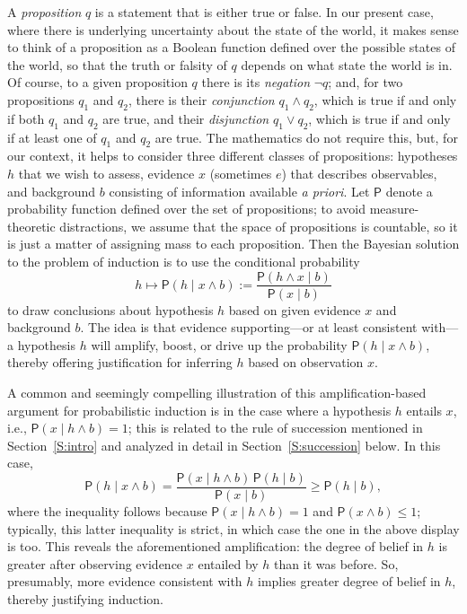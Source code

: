 \documentclass[a4paper, 12pt]{article}
\theoremstyle{plain}
\theoremstyle{definition}
\theoremstyle{remark}
\newcommand{\prob}{\mathsf{P}}
\begin{document}
A {\em proposition} $q$ is a statement that is either true or false.  In our present case, where there is underlying uncertainty about the state of the world, it makes sense to think of a proposition as a Boolean function defined over the possible states of the world, so that the truth or falsity of $q$ depends on what state the world is in.  Of course, to a given proposition $q$ there is its {\em negation} $\neg q$; and, for two propositions $q_1$ and $q_2$, there is their {\em conjunction} $q_1 \land q_2$, which is true if and only if both $q_1$ and $q_2$ are true, and their {\em disjunction} $q_1 \lor q_2$, which is true if and only if at least one of $q_1$ and $q_2$ are true.  The mathematics do not require this, but, for our context, it helps to consider three different classes of propositions: hypotheses $h$ that we wish to assess, evidence $x$ (sometimes $e$) that describes observables, and background $b$ consisting of information available {\em a priori}.  Let $\prob$ denote a probability function defined over the set of propositions; to avoid measure-theoretic distractions, we assume that the space of propositions is countable, so it is just a matter of assigning mass to each proposition.  Then the Bayesian solution to the problem of induction is to use the conditional probability 
\[ h \mapsto \prob(h \mid x \land b) := \frac{\prob(h \land x \mid b)}{\prob(x \mid b)} \]
to draw conclusions about hypothesis $h$ based on given evidence $x$ and background $b$.  The idea is that evidence supporting---or at least consistent with---a hypothesis $h$ will amplify, boost, or drive up the probability $\prob(h \mid x \land b)$, thereby offering justification for inferring $h$ based on observation $x$.  

A common \citep[e.g.,][p.~64]{earman.bust} and seemingly compelling illustration of this amplification-based argument for probabilistic induction is in the case where a hypothesis $h$ entails $x$, i.e., $\prob(x \mid h \land b) = 1$; this is related to the rule of succession mentioned in Section~\ref{S:intro} and analyzed in detail in Section~\ref{S:succession} below.  In this case, 
\begin{equation}
\label{eq:amplify}
\prob(h \mid x \land b) = \frac{\prob(x \mid h \land b) \, \prob(h \mid b)}{\prob(x \mid b)} \geq \prob(h \mid b), 
\end{equation}
where the inequality follows because $\prob(x \mid h \land b) = 1$ and $\prob(x \land b) \leq 1$; typically, this latter inequality is strict, in which case the one in the above display is too.  This reveals the aforementioned amplification: the degree of belief in $h$ is greater after observing evidence $x$ entailed by $h$ than it was before.  So, presumably, more evidence consistent with $h$ implies greater degree of belief in $h$, thereby justifying induction.  
\end{document}
